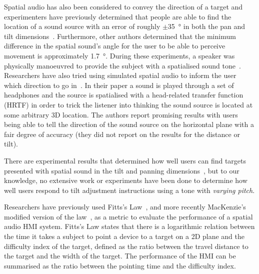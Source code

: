 \documentclass[format=sigconf, review=true, screen=true, anonymous=true]{acmart}
\begin{document}
Spatial audio has also been considered to convey the direction of a target and experimenters have previously determined that people are able to find the location of a sound source with an error of roughly $\pm$\SI{35}{\degree} in both the pan and tilt dimensions~\cite{zwiers2001spatial}. Furthermore, other authors determined that the minimum difference in the spatial sound's angle for the user to be able to perceive movement is approximately \SI{1.7}{\degree}. During these experiments, a speaker was physically manoeuvred to provide the subject with a spatialised sound tone~\cite{ashmead1998spatial}. Researchers have also tried using simulated spatial audio to inform the user which direction to go in~\cite{holland2002audiogps}. In their paper a sound is played through a set of headphones and the source is spatialised with a head-related transfer function (HRTF) in order to trick the listener into thinking the sound source is located at some arbitrary 3D location. The authors report promising results with users being able to tell the direction of the sound source on the horizontal plane with a fair degree of accuracy (they did not report on the results for the distance or tilt). %

There are experimental results that determined how well users can find targets presented with spatial sound in the tilt and panning dimensions~\cite{katz2011spatial, zwiers2001spatial}, but to our knowledge, no extensive work or experiments have been done to determine how well users respond to tilt adjustment instructions using a tone with \emph{varying pitch}. %

Researchers have previously used Fitts's Law~\cite{fitts1954information}, and more recently MacKenzie's modified version of the law~\cite{mackenzie1992fitts}, as a metric to evaluate the performance of a spatial audio HMI system. Fitts's Law states that there is a logarithmic relation between the time it takes a subject to point a device to a target on a 2D plane and the difficulty index of the target, defined as the ratio between the travel distance to the target and the width of the target. The performance of the HMI can be summarised as the ratio between the pointing time and the difficulty index. 

\end{document}
